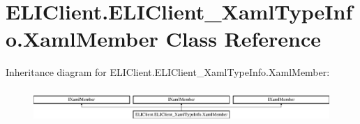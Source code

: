 \hypertarget{class_e_l_i_client_1_1_e_l_i_client___xaml_type_info_1_1_xaml_member}{}\section{E\+L\+I\+Client.\+E\+L\+I\+Client\+\_\+\+Xaml\+Type\+Info.\+Xaml\+Member Class Reference}
\label{class_e_l_i_client_1_1_e_l_i_client___xaml_type_info_1_1_xaml_member}
Inheritance diagram for E\+L\+I\+Client.\+E\+L\+I\+Client\+\_\+\+Xaml\+Type\+Info.\+Xaml\+Member\+:\begin{figure}[H]
\begin{center}
\leavevmode
\includegraphics[height=1.305361cm]{da/dbd/class_e_l_i_client_1_1_e_l_i_client___xaml_type_info_1_1_xaml_member}
\end{center}
\end{figure}
